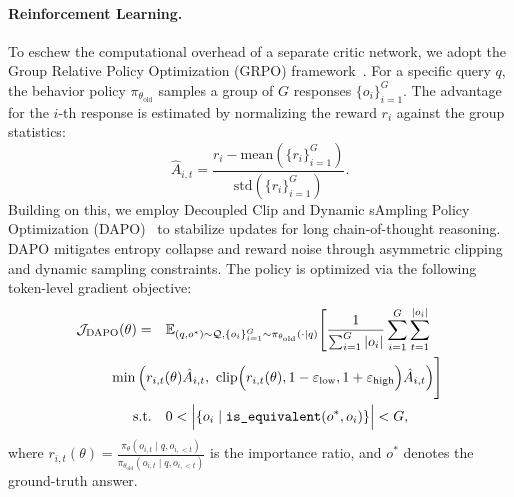 \paragraph{Reinforcement Learning.}
To eschew the computational overhead of a separate critic network, we adopt the Group Relative Policy Optimization (GRPO) framework~\citep{shao2024deepseekmath,guo2025deepseek}. For a specific query $q$, the behavior policy $\pi_{\theta_\text{old}}$ samples a group of $G$ responses $\{o_i\}_{i=1}^G$. The advantage for the $i$-th response is estimated by normalizing the reward $r_i$ against the group statistics:
\begin{equation}
\label{eq:advantage}
\hat{A}_{i,t} = \frac{r_i - \text{mean}(\{r_i\}_{i=1}^G)}{\text{std}(\{r_i\}_{i=1}^G)}.
\end{equation}
Building on this, we employ Decoupled Clip and Dynamic sAmpling Policy Optimization (DAPO)~\citep{yu2025dapo} to stabilize updates for long chain-of-thought reasoning. DAPO mitigates entropy collapse and reward noise through asymmetric clipping and dynamic sampling constraints. The policy is optimized via the following token-level gradient objective:
{\small
\begin{equation}
\begin{aligned}
\mathcal{J}_{\text{DAPO}}(\theta) =\quad& \mathbb{E}_{(q,o^*)\sim \mathcal{Q}, \{o_i\}_{i=1}^G\sim \pi_{\theta_\text{old}}(\cdot\mid q)}
\Bigg[\frac{1}{\sum_{i=1}^{G}|o_i|}\sum_{i=1}^{G}\sum_{t=1}^{|o_i|} \\
&\hspace{-4em} \min \Big( r_{i,t}(\theta) \hat{A}_{i,t},  
\ \text{clip} \Big( r_{i,t}(\theta), 1 - {\varepsilon_{\text{low}}}, 1 + {\varepsilon_{\text{high}}} \Big) \hat{A}_{i,t} \Big) \Bigg]
\\
\text{s.t.}\quad& 0< \Big|\{o_i\mid\texttt{is\_equivalent}(o^*,o_i)\}\Big|< G,
\label{eq:dapoloss}
\end{aligned}
\end{equation}
}
where $r_{i,t}(\theta)=\frac{\pi_{\theta}(o_{i,t} \mid q, o_{i,<t})}{\pi_{\theta_{\text{old}}}(o_{i,t} \mid q,o_{i,<t})}$ is the importance ratio, and $o^*$ denotes the ground-truth answer.
